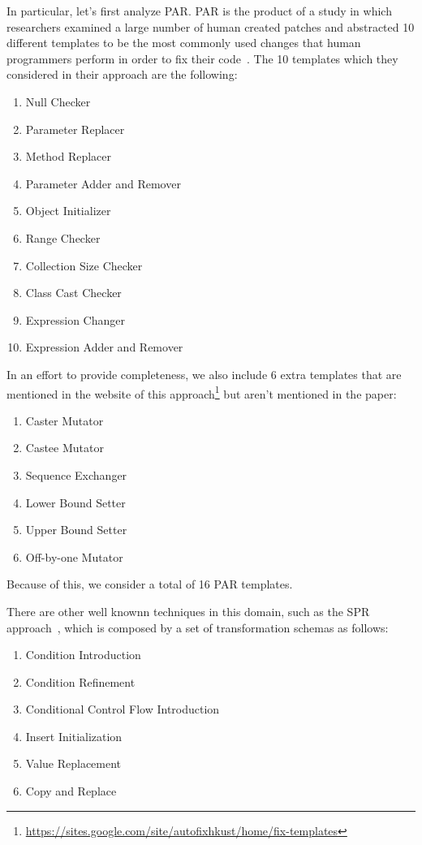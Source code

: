 \documentclass[conference]{IEEEtran}
\begin{document}
In particular, let's first analyze PAR. PAR is the product of a study in which researchers examined a large number of human 
created patches and abstracted 10 different templates to be the most 
commonly used changes that human programmers perform in order to fix their code~\cite{kim2013}.
The 10 templates which they considered in their approach are the following:
\begin{enumerate}
 \item Null Checker
 \item Parameter Replacer
 \item Method Replacer
 \item Parameter Adder and Remover
 \item Object Initializer
 \item Range Checker
 \item Collection Size Checker
 \item Class Cast Checker
 \item Expression Changer
 \item Expression Adder and Remover
\end{enumerate}

In an effort to provide completeness, we also include 6 extra templates that are mentioned in the website of this approach\footnote{\url{https://sites.google.com/site/autofixhkust/home/fix-templates}} but aren't mentioned in the paper\cite{kim2013}: 

\begin{enumerate}
\item Caster Mutator
\item Castee Mutator
\item Sequence Exchanger
\item Lower Bound Setter
\item Upper Bound Setter
\item Off-by-one Mutator
\end{enumerate}

Because of this, we consider a total of 16 PAR templates.

There are other well knownn techniques in this domain, such as the SPR approach~\cite{fan15}, which is composed by a set of transformation schemas as follows:
\begin{enumerate}
\item Condition Introduction
\item Condition Refinement
\item Conditional Control Flow Introduction
\item Insert Initialization
\item Value Replacement
\item Copy and Replace
\end{enumerate}
\end{document}
